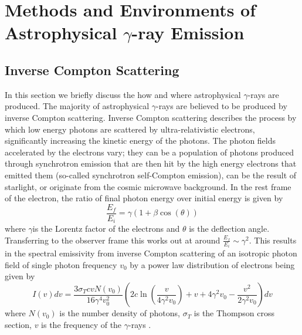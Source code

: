 \section{Methods and Environments of Astrophysical \ensuremath{\gamma}-ray Emission}
\subsection{Inverse Compton Scattering}

In this section we briefly discuss the how and where astrophysical $\gamma$-rays are produced. The majority of astrophysical $\gamma$-rays are believed to be produced by inverse Compton scattering. Inverse Compton scattering describes the process by which low energy photons are scattered by ultra-relativistic electrons, significantly increasing the kinetic energy of the photons. The photon fields accelerated by the electrons vary; they can be a population of photons produced through synchrotron emission that are then hit by the high energy electrons that emitted them (so-called synchrotron self-Compton emission), can be the result of starlight, or originate from the cosmic microwave background. In the rest frame of the electron, the ratio of final photon energy over initial energy is given by
\begin{equation}
    \frac{E_f}{E_i}=\gamma (1+\beta \cos(\theta))
\end{equation}
where $\gamma$is the Lorentz factor of the electrons and $\theta$ is the deflection angle. Transferring to the observer frame this works out at around $\frac{E_f}{E_i}\sim \gamma^2$. This results in the spectral emissivity from inverse Compton scattering of an isotropic photon field of single photon frequency $v_0$ by a power law distribution of electrons being given by 
\begin{equation}
    I(v)dv=\frac{3\sigma_TcvN(v_0)}{16\gamma^4v_0^2}\left(2c\ln\left(\frac{v}{4\gamma^2v_0}\right)+v+4\gamma^2v_0-\frac{v^2}{2\gamma^2v_0}\right)dv
\end{equation}
where $N(v_0)$ is the number density of photons, $\sigma_T$ is the Thompson cross section, $v$ is the frequency of the $\gamma$-rays \cite{blumenthal}.



